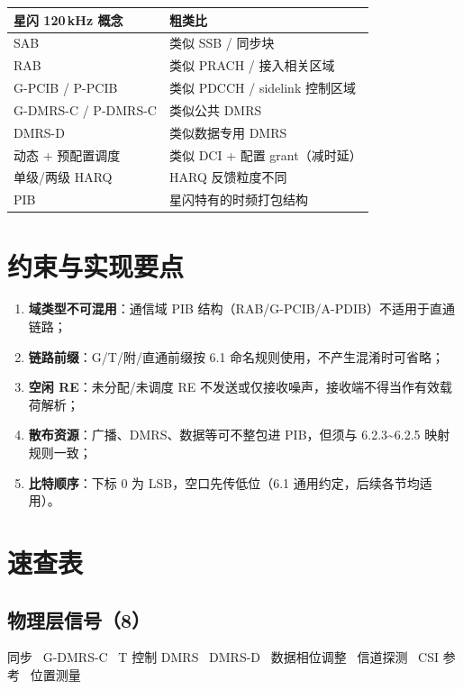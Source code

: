 \documentclass[11pt,a4paper]{ctexart}
\begin{document}
\begin{table}[h]
\centering
\small
\begin{tabular}{ll}
\toprule
\textbf{星闪 120\,kHz 概念} & \textbf{粗类比} \\
\midrule
SAB & 类似 SSB / 同步块 \\
RAB & 类似 PRACH / 接入相关区域 \\
G-PCIB / P-PCIB & 类似 PDCCH / sidelink 控制区域 \\
G-DMRS-C / P-DMRS-C & 类似公共 DMRS \\
DMRS-D & 类似数据专用 DMRS \\
动态 + 预配置调度 & 类似 DCI + 配置 grant（减时延） \\
单级/两级 HARQ & HARQ 反馈粒度不同 \\
PIB & 星闪特有的时频打包结构 \\
\bottomrule
\end{tabular}
\end{table}

\section{约束与实现要点}

\begin{enumerate}[nosep]
  \item \textbf{域类型不可混用}：通信域 PIB 结构（RAB/G-PCIB/A-PDIB）不适用于直通链路；
  \item \textbf{链路前缀}：G/T/附/直通前缀按 6.1 命名规则使用，不产生混淆时可省略；
  \item \textbf{空闲 RE}：未分配/未调度 RE 不发送或仅接收噪声，接收端不得当作有效载荷解析；
  \item \textbf{散布资源}：广播、DMRS、数据等可不整包进 PIB，但须与 6.2.3\textasciitilde 6.2.5 映射规则一致；
  \item \textbf{比特顺序}：下标 0 为 LSB，空口先传低位（6.1 通用约定，后续各节均适用）。
\end{enumerate}

\section{速查表}

\subsection{物理层信号（8）}
同步 \textbar\ G-DMRS-C \textbar\ T 控制 DMRS \textbar\ DMRS-D \textbar\ 数据相位调整 \textbar\ 信道探测 \textbar\ CSI 参考 \textbar\ 位置测量
\end{document}
